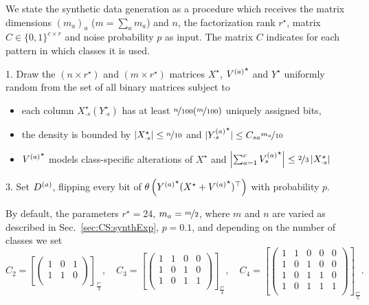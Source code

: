 We state the synthetic data generation as a procedure which receives the matrix dimensions $(m_a)_a$ ($m=\sum_am_a$) and $n$, the factorization rank $r^\star$, matrix $C\in\{0,1\}^{c\times r}$ and noise probability $p$ as input. The matrix $C$ indicates for each pattern in which classes it is used.
\begin{description}
\item [\textbf{GenerateData}($n,(m_a)_a,r^\star,C,p$)]
\item 1. Draw the $(n\times r^\star)$ and $(m\times r^\star)$ matrices $X^\star$, ${V^{(a)}}^\star$ and $Y^\star$ uniformly random from the set of all  binary matrices subject to
\begin{itemize}
	\item each column $X^\star_{\cdot s} (Y^\star_{\cdot s})$ has at least $\nicefrac{n}{100}(\nicefrac{m}{100})$ uniquely assigned bits,
	\item the density is bounded by $|X^\star_{\cdot s}|\leq \nicefrac{n}{10}$ and $|{Y^{(a)}_{\cdot s}}^\star|\leq C_{sa}\nicefrac{m_a}{10}$
	\item ${V^{(a)}}^\star$ models class-specific alterations of $X^\star$ and
$\left|\sum_{a=1}^c{V^{(a)}_{s}}^\star\right|\leq \nicefrac{2}{3} \left|X^\star_{\cdot s}\right|$
\end{itemize}
\item 3. Set $D^{(a)}$, flipping every bit of $\theta\left({Y^{(a)}}^\star (X^\star+{V^{(a)}}^\star)^\top \right)$ with probability $p$.
\end{description}
By default, the parameters $r^\star=24$, $m_a=\nicefrac{m}{2}$, where $m$ and $n$ are varied as described in Sec.~\ref{sec:CS:synthExp}, $p=0.1$, and depending on the number of classes we set
\[C_2=\left[
\begin{pmatrix}
1 & 0 & 1\\
1 & 1 & 0\\
\end{pmatrix}\right]_{\frac{r^\star}{3}},\quad C_3=\left[\begin{pmatrix}
1 & 1 & 0 & 0\\
1 & 0 & 1 & 0\\
1& 0 & 1 & 1\\
\end{pmatrix}\right]_{\frac{r^\star}{4}},\quad
C_4=\left[\begin{pmatrix}
1 & 1 & 0 & 0 & 0\\
1 & 0 & 1 & 0 & 0\\
1 & 0 & 1 & 1 & 0\\
1 & 0 & 1 & 1 & 1\\
\end{pmatrix}\right]_{\frac{r^\star}{5}} .\]
